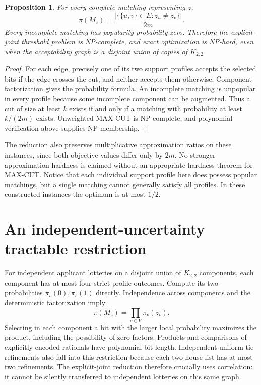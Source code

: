 \documentclass[11pt]{article}
\newtheorem{proposition}{Proposition}
\begin{document}
\begin{proposition}
For every complete matching representing $z$,
\[
 \pi(M_z)=\frac{|\{\{u,v\}\in E:z_u\neq z_v\}|}{2m}.
\]
Every incomplete matching has popularity probability zero. Therefore the explicit-joint threshold problem is NP-complete, and exact optimization is NP-hard, even when the acceptability graph is a disjoint union of copies of $K_{2,2}$.
\end{proposition}
\begin{proof}
For each edge, precisely one of its two support profiles accepts the selected bits if the edge crosses the cut, and neither accepts them otherwise. Component factorization gives the probability formula. An incomplete matching is unpopular in every profile because some incomplete component can be augmented. Thus a cut of size at least $k$ exists if and only if a matching with probability at least $k/(2m)$ exists. Unweighted MAX-CUT is NP-complete, and polynomial verification above supplies NP membership.
\end{proof}
The reduction also preserves multiplicative approximation ratios on these instances, since both objective values differ only by $2m$. No stronger approximation hardness is claimed without an appropriate hardness theorem for MAX-CUT. Notice that each individual support profile here does possess popular matchings, but a single matching cannot generally satisfy all profiles. In these constructed instances the optimum is at most $1/2$.

\section{An independent-uncertainty tractable restriction}
For independent applicant lotteries on a disjoint union of $K_{2,2}$ components, each component has at most four strict profile outcomes. Compute its two probabilities $\pi_v(0),\pi_v(1)$ directly. Independence across components and the deterministic factorization imply
\[
 \pi(M_z)=\prod_{v\in V}\pi_v(z_v).
\]
Selecting in each component a bit with the larger local probability maximizes the product, including the possibility of zero factors. Products and comparisons of explicitly encoded rationals have polynomial bit length. Independent uniform tie refinements also fall into this restriction because each two-house list has at most two refinements. The explicit-joint reduction therefore crucially uses correlation: it cannot be silently transferred to independent lotteries on this same graph.
\end{document}
